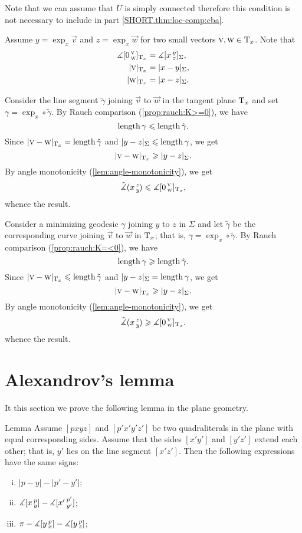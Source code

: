 Note that we can assume that $U$ is simply connected therefore this condition is not necessary to include in part \ref{SHORT.thm:loc-comp:cba}.

Assume $y=\exp_x\vec v$ and $z=\exp_x\vec w$ for two small vectors $\textsc v,\textsc w\in\mathrm{T}_x$.
Note that 
\begin{align*}
\measuredangle[0\,{}^{\textsc v}_{\textsc w}]_{\mathrm{T}_x}&=\measuredangle[x\,{}^{y}_{z}]_\Sigma,
\\
|\textsc v|_{\mathrm{T}_x}&=|x-y|_\Sigma, 
\\
|\textsc w|_{\mathrm{T}_x}&=|x-z|_\Sigma.
\end{align*}

Consider the line segment $\tilde \gamma$ joining $\vec v$ to $\vec w$ in the tangent plane $\mathrm{T}_x$ and set $\gamma=\exp_x\circ\tilde \gamma$.
By Rauch comparison (\ref{prop:rauch:K>=0}), we have
\[\mathop{\rm length}\nolimits\gamma\leqslant \mathop{\rm length}\nolimits \tilde \gamma.\]
Since $|\textsc v-\textsc w|_{\mathrm{T}_x}=\mathop{\rm length}\nolimits\tilde \gamma$ and $|y-z|_{\Sigma}\leqslant \mathop{\rm length}\nolimits\gamma$, we get 
\[|\textsc v-\textsc w|_{\mathrm{T}_x}\geqslant |y-z|_\Sigma.\]
By angle monotonicity (\ref{lem:angle-monotonicity}), we get
\[\tilde\measuredangle(x\,{}^{z}_{y}\hspace{-0.2ex})\leqslant\measuredangle[0\,{}^{\textsc v}_{\textsc w}]_{\mathrm{T}_x},\]
whence the result.

Consider a minimizing geodesic $\gamma$ joining $y$ to $z$ in $\Sigma$ and let $\tilde \gamma$ be the corresponding curve joining $\vec v$ to $\vec w$ in $\mathrm{T}_x$; that is,  $\gamma=\exp_x\circ\tilde \gamma$.
By Rauch comparison (\ref{prop:rauch:K=<0}), we have
\[\mathop{\rm length}\nolimits\gamma\geqslant \mathop{\rm length}\nolimits \tilde \gamma.\]
Since $|\textsc v-\textsc w|_{\mathrm{T}_x}\leqslant\mathop{\rm length}\nolimits\tilde \gamma$ and $|y-z|_{\Sigma}= \mathop{\rm length}\nolimits\gamma$, we get 
\[|\textsc v-\textsc w|_{\mathrm{T}_x}\geqslant |y-z|_\Sigma.\]
By angle monotonicity (\ref{lem:angle-monotonicity}), we get
\[\tilde\measuredangle(x\,{}^{z}_{y}\hspace{-0.2ex})\geqslant\measuredangle[0\,{}^{\textsc v}_{\textsc w}]_{\mathrm{T}_x}.\]
whence the result.
\qedsf

\section{Alexandrov's lemma}

It this section we prove the following lemma in the plane geometry.

\begin{thm}{Lemma}
\label{lem:alex}
Assume $[pxyz]$ and $[p'x'y'z']$ be two quadraliterals in the plane with equal corresponding sides.
Assume that the sides $[x'y']$ and $[y'z']$ extend each other; that is, $y'$ lies on the line segment $[x'z']$.
Then the following expressions have the same signs:
\begin{enumerate}[(i)]
 \item $|p-y|-|p'-y'|$;
 \item $\measuredangle[x\,{}^{p}_{y}]-\measuredangle[x'\,{}^{p'}_{y'}]$;
 \item $\pi-\measuredangle[y\,{}^{p}_{x}]-\measuredangle[y\,{}^{p}_{z}]$;
\end{enumerate}
\end{thm}

